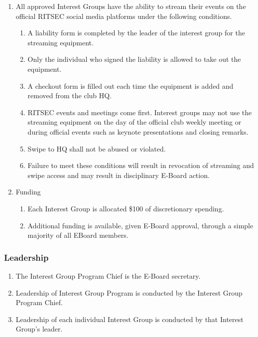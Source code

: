 \documentclass{article}
\begin{document}
\begin{enumerate}
  \item All approved Interest Groups have the ability to stream their events on
    the official RITSEC social media platforms under the following conditions.
  \begin{enumerate}
    \item A liability form is completed by the leader of the interest group for
      the streaming equipment.
    \item Only the individual who signed the liability is allowed to take out
      the equipment.
    \item A checkout form is filled out each time the equipment is added and
      removed from the club HQ.
    \item RITSEC events and meetings come first. Interest groups may not use
      the streaming equipment on the day of the official club weekly meeting or
      during official events such as keynote presentations and closing remarks.
    \item Swipe to HQ shall not be abused or violated.
    \item Failure to meet these conditions will result in revocation of
      streaming and swipe access and may result in disciplinary E-Board action.
  \end{enumerate}
  \item Funding
  \begin{enumerate}
    \item Each Interest Group is allocated \$100 of discretionary spending.
    \item Additional funding is available, given E-Board approval, through a
      simple majority of all EBoard members. 
  \end{enumerate}
\end{enumerate}

\subsubsection{Leadership}

\begin{enumerate}
  \item The Interest Group Program Chief is the E-Board secretary.
  \item Leadership of Interest Group Program is conducted by the Interest Group
    Program Chief.
  \item Leadership of each individual Interest Group is conducted by that
    Interest Group's leader.
\end{enumerate}
\end{document}
